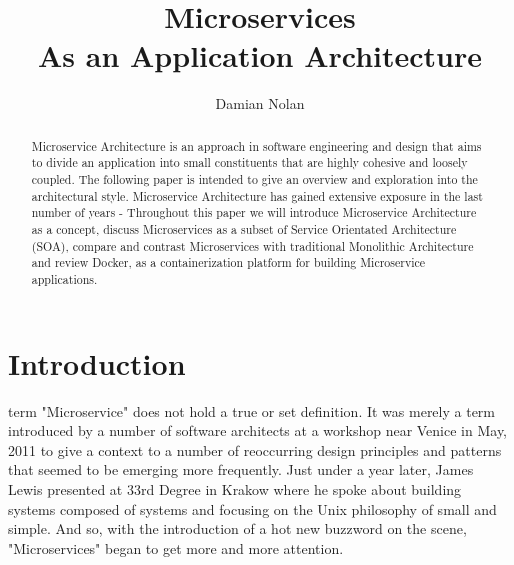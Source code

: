 \documentclass[journal]{IEEEtran}
\begin{document}
\title{Microservices \\ As an Application Architecture}


\author{ Damian Nolan }

\maketitle

\begin{abstract}
Microservice Architecture is an approach in software engineering and design that aims to divide an application into small constituents that are highly cohesive and loosely coupled. The following paper is intended to give an overview and exploration into the architectural style. Microservice Architecture has gained extensive exposure in the last number of years - Throughout this paper we will introduce Microservice Architecture as a concept, discuss Microservices as a subset of Service Orientated Architecture (SOA), compare and contrast Microservices with traditional Monolithic Architecture and review Docker, as a containerization platform for building Microservice applications.
\end{abstract}

\section{Introduction}
% 
% 
% 
% 
 term "Microservice" does not hold a true or set definition. It was merely a term introduced by a number of software architects at a workshop near Venice in May, 2011 to give a context to a number of reoccurring design principles and patterns that seemed to be emerging more frequently.
	Just under a year later, James Lewis presented at 33rd Degree in Krakow where he spoke about building systems composed of systems and focusing on the Unix philosophy of small and simple. \cite{JamesLewis33rdDegree} 
And so, with the introduction of a hot new buzzword on the scene, "Microservices" began to get more and more attention. 
\end{document}
